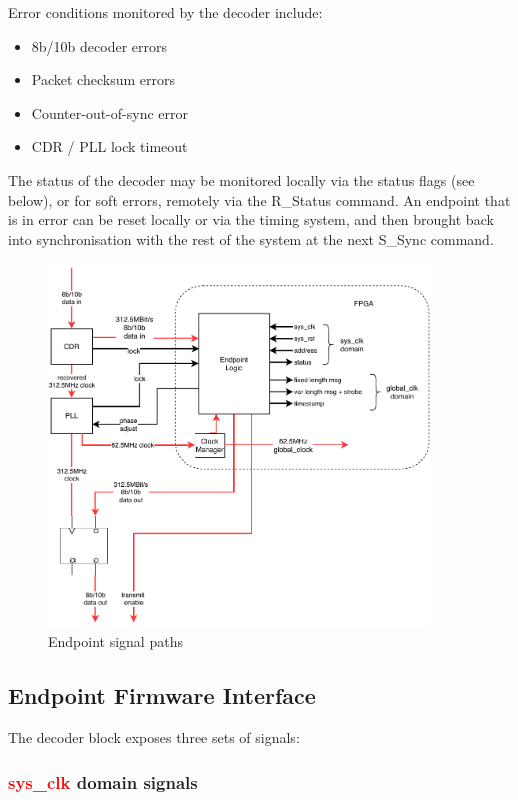 \documentclass[a4paper,11pt]{article}
\begin{document}
Error conditions monitored by the decoder include:

\begin{itemize}
	\item 8b/10b decoder errors
	\item Packet checksum errors
	\item Counter-out-of-sync error
	\item CDR / PLL lock timeout
\end{itemize}

The status of the decoder may be monitored locally via the status flags (see below), or for soft errors, remotely via the R\_Status command. An endpoint that is in error can be reset locally or via the timing system, and then brought back into synchronisation with the rest of the system at the next S\_Sync command.

\begin{figure}[p]
	\centering
	\includegraphics[width=0.9\textwidth]{timing_endpoint_block.pdf}
	\caption{Endpoint signal paths}
	\label{fig:fw_if}
\end{figure}

\subsection{Endpoint Firmware Interface}

The decoder block exposes three sets of signals:

\subsubsection{\textcolor{red}{sys\_clk} domain signals}
\end{document}
